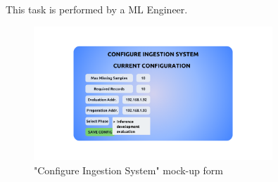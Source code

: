 This task is performed by a ML Engineer.

\begin{figure}[H]
\centering
\includegraphics[width=0.8\textwidth]{figures/ui_configure_ingestion.png}
\caption{"Configure Ingestion System" mock-up form}
\end{figure}

